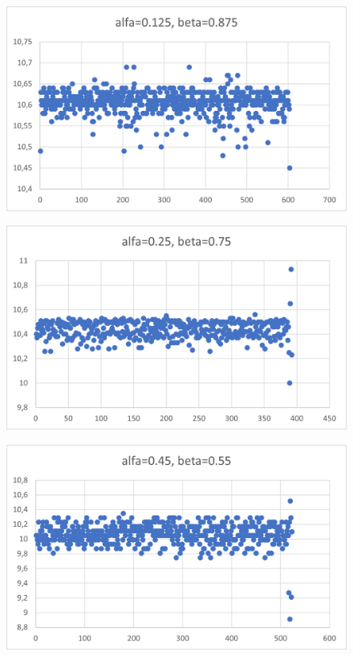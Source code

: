 \documentclass[12pt]{mwart}
\begin{document}
	\begin{figure}[H]
		\centering
		\includegraphics{10_a0.125.png}
	\end{figure}
	\begin{figure}[H]
		\centering
		\includegraphics{10_a0.25.png}
	\end{figure}
	\begin{figure}[H]
		\centering
		\includegraphics{10_a0.45.png}
	\end{figure}
\end{document}
